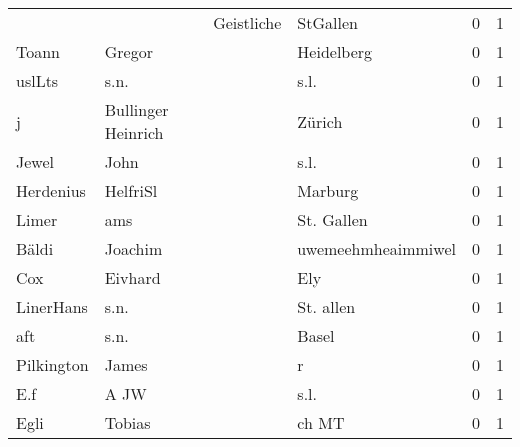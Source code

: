 \begin{center}
\begin{tiny}
\begin{longtabu}{llllrr}
                          &                                    &  Geistliche &                                    StGallen &          0 &         1 \\
                    Toann &                             Gregor &             &                                  Heidelberg &          0 &         1 \\
                   uslLts &                               s.n. &             &                                        s.l. &          0 &         1 \\
                        j &                 Bullinger Heinrich &             &                                      Zürich &          0 &         1 \\
                    Jewel &                               John &             &                                        s.l. &          0 &         1 \\
                Herdenius &                           HelfriSl &             &                                     Marburg &          0 &         1 \\
                    Limer &                                ams &             &                                  St. Gallen &          0 &         1 \\
                    Bäldi &                            Joachim &             &                          uwemeehmheaimmiwel &          0 &         1 \\
                      Cox &                            Eivhard &             &                                         Ely &          0 &         1 \\
                LinerHans &                               s.n. &             &                                   St. allen &          0 &         1 \\
                      aft &                               s.n. &             &                                       Basel &          0 &         1 \\
               Pilkington &                              James &             &                                           r &          0 &         1 \\
                      E.f &                               A JW &             &                                        s.l. &          0 &         1 \\
                     Egli &                             Tobias &             &                                       ch MT &          0 &         1 \\

\end{longtabu}
\end{tiny}
\end{center}
